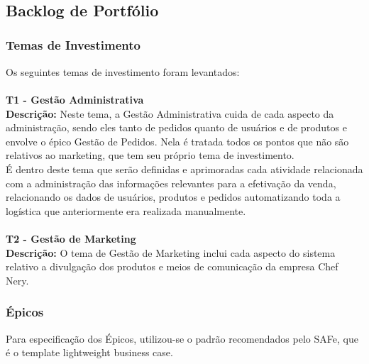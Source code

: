 \tab \\ \\ \\

\subsection{Backlog de Portfólio}


\subsubsection{Temas de Investimento}

Os seguintes temas de investimento foram levantados:\\
\tab \\
\textbf{T1 - Gestão Administrativa}
\tab \\
\textbf{Descrição:} Neste tema, a Gestão Administrativa cuida de cada aspecto da administração, sendo eles tanto de pedidos quanto de usuários e de produtos e envolve o épico Gestão de Pedidos. Nela é tratada todos os pontos que não são relativos ao marketing, que tem seu próprio tema de investimento. \\
\tab É dentro deste tema que serão definidas e aprimoradas cada atividade relacionada com a administração das informações relevantes para a efetivação da venda, relacionando os dados de usuários, produtos e pedidos automatizando toda a logística que anteriormente era realizada manualmente.\\

\tab \\
\textbf{T2 - Gestão de Marketing}
\tab \\
\textbf{Descrição:} O tema de Gestão de Marketing inclui cada aspecto do sistema relativo a divulgação dos produtos e meios de comunicação da empresa Chef Nery. \\

\subsubsection{Épicos}
Para especificação dos Épicos, utilizou-se o padrão recomendados pelo SAFe, que é o template lightweight business case.\\

\tab \\ \\ \\

